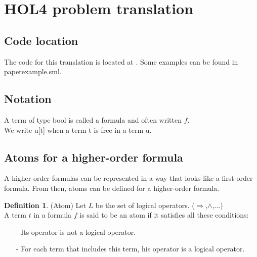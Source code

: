 \documentclass[a4paper, 11pt]{article}
\theoremstyle{plain}
\theoremstyle{definition}
\newtheorem*{mydef}{Definition}
\theoremstyle{remark}
\begin{document}
\section{HOL4 problem translation}

\subsection{Code location}
The code for this translation is located at . Some examples can be found in paperexample.sml.

\subsection{Notation}
A term of type bool is called a formula and often written $f$.
\\We write u[t] when a term t is free in a term u. 

\subsection{Atoms for a higher-order formula}
A higher-order formulas can be represented in a way that looks like a first-order formula. From then, atoms can be defined for a higher-order formula.

\begin{mydef} (Atom)
Let $L$ be the set of logical operators. ($\Rightarrow$,$\wedge$,$\ldots$)
\\A term $t$ in a formula $f$ is said to be an atom if it satisfies all these conditions:
\begin{enumerate}
\item [-] Its operator is not a logical operator.
\item [-] For each term that includes this term, his operator is a logical operator. 
\end{enumerate}
\end{mydef}
\end{document}
